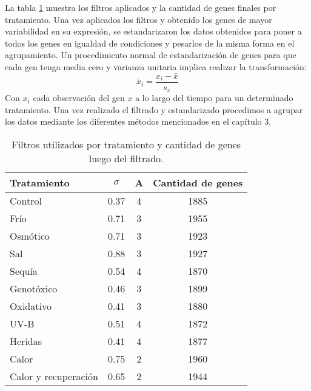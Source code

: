 La tabla \ref{tabla:genes_por_tratamiento} muestra los filtros aplicados y la cantidad de genes finales por tratamiento.
Una vez aplicados los filtros y obtenido los genes de mayor variabilidad en su expresión, se estandarizaron los datos obtenidos para poner a todos los genes en igualdad de condiciones y pesarlos de la misma forma en el agrupamiento. Un procedimiento normal de estandarización de genes para que cada gen tenga media cero y varianza unitaria implica realizar la transformación:
\begin{equation}
	\tilde{x_i} = \frac{x_i-\bar{x}}{s_x}
\end{equation}
Con $x_i$ cada observación del gen $x$ a lo largo del tiempo para un determinado tratamiento. Una vez realizado el filtrado y estandarizado procedimos a agrupar los datos mediante los diferentes métodos mencionados en el capítulo 3.
\begin{table}[t]
  \centering
\begin{tabular}{| l | c | c | c |}
\hline
Tratamiento & $\sigma$ & A & Cantidad de genes \\
\hline
Control & 0.37 & 4 & 1885 \\
\hline
Frío & 0.71 & 3 & 1955 \\
\hline
Osmótico & 0.71 & 3 & 1923 \\
\hline
Sal & 0.88 & 3 & 1927 \\
\hline
Sequía & 0.54 & 4 & 1870 \\
\hline
Genotóxico & 0.46 & 3 & 1899 \\
\hline
Oxidativo & 0.41 & 3 & 1880 \\
\hline
UV-B & 0.51 & 4 & 1872 \\
\hline
Heridas & 0.41 & 4 & 1877 \\
\hline
Calor & 0.75 & 2 & 1960 \\
\hline
Calor y recuperación & 0.65 & 2 & 1944 \\
\hline                                         
\end{tabular}
\caption{Filtros utilizados por tratamiento y cantidad de genes luego del filtrado.}
\label{tabla:genes_por_tratamiento}
\end{table}
